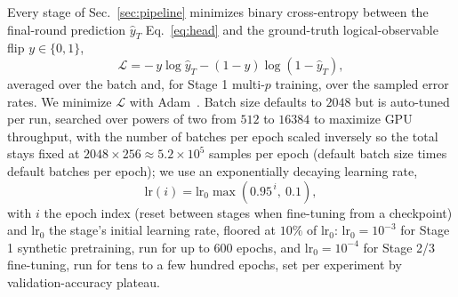\documentclass[aps,prxquantum,twocolumn,superscriptaddress,nofootinbib]{revtex4-2}
\begin{document}
Every stage of Sec.~\ref{sec:pipeline} minimizes binary cross-entropy between the final-round prediction $\hat y_T$ Eq.~\eqref{eq:head} and the ground-truth logical-observable flip $y \in \{0, 1\}$,
\begin{equation}
\mathcal{L} = -\, y \log \hat y_T - (1 - y) \log(1 - \hat y_T),
\label{eq:loss}
\end{equation}
averaged over the batch and, for Stage 1 multi-$p$ training, over the sampled error rates. We minimize $\mathcal L$ with Adam~\cite{kingma2015adam}. Batch size defaults to $2048$ but is auto-tuned per run, searched over powers of two from $512$ to $16384$ to maximize GPU throughput, with the number of batches per epoch scaled inversely so the total stays fixed at $2048 \times 256 \approx 5.2 \times 10^5$ samples per epoch (default batch size times default batches per epoch); we use an exponentially decaying learning rate,
\begin{equation}
\mathrm{lr}(i) = \mathrm{lr}_0 \max\!\left(0.95^{\,i},\ 0.1\right),
\label{eq:lr_schedule}
\end{equation}
with $i$ the epoch index (reset between stages when fine-tuning from a checkpoint) and $\mathrm{lr}_0$ the stage's initial learning rate, floored at $10\%$ of $\mathrm{lr}_0$: $\mathrm{lr}_0 = 10^{-3}$ for Stage 1 synthetic pretraining, run for up to $600$ epochs, and $\mathrm{lr}_0 = 10^{-4}$ for Stage 2/3 fine-tuning, run for tens to a few hundred epochs, set per experiment by validation-accuracy plateau.
\end{document}
